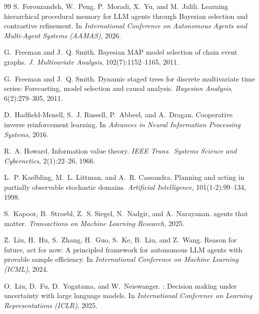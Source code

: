 \documentclass[11pt]{article}
\begin{document}
\begin{thebibliography}{99}
S.~Forouzandeh, W.~Peng, P.~Moradi, X.~Yu, and M.~Jalili.
\newblock Learning hierarchical procedural memory for {LLM} agents through {B}ayesian selection and contrastive refinement.
\newblock In \emph{International Conference on Autonomous Agents and Multi-Agent Systems (AAMAS)}, 2026.

G.~Freeman and J.~Q. Smith.
\newblock Bayesian {MAP} model selection of chain event graphs.
\newblock \emph{J. Multivariate Analysis}, 102(7):1152--1165, 2011.

G.~Freeman and J.~Q. Smith.
\newblock Dynamic staged trees for discrete multivariate time series: Forecasting, model selection and causal analysis.
\newblock \emph{Bayesian Analysis}, 6(2):279--305, 2011.

D.~Hadfield-Menell, S.~J. Russell, P.~Abbeel, and A.~Dragan.
\newblock Cooperative inverse reinforcement learning.
\newblock In \emph{Advances in Neural Information Processing Systems}, 2016.

R.~A. Howard.
\newblock Information value theory.
\newblock \emph{IEEE Trans.\ Systems Science and Cybernetics}, 2(1):22--26, 1966.

L.~P. Kaelbling, M.~L. Littman, and A.~R. Cassandra.
\newblock Planning and acting in partially observable stochastic domains.
\newblock \emph{Artificial Intelligence}, 101(1-2):99--134, 1998.

S.~Kapoor, B.~Stroebl, Z.~S. Siegel, N.~Nadgir, and A.~Narayanan.
 agents that matter.
\newblock \emph{Transactions on Machine Learning Research}, 2025.

Z.~Liu, H.~Hu, S.~Zhang, H.~Guo, S.~Ke, B.~Liu, and Z.~Wang.
\newblock Reason for future, act for now: A principled framework for autonomous {LLM} agents with provable sample efficiency.
\newblock In \emph{International Conference on Machine Learning (ICML)}, 2024.

O.~Liu, D.~Fu, D.~Yogatama, and W.~Neiswanger.
: Decision making under uncertainty with large language models.
\newblock In \emph{International Conference on Learning Representations (ICLR)}, 2025.


\end{thebibliography}
\end{document}
